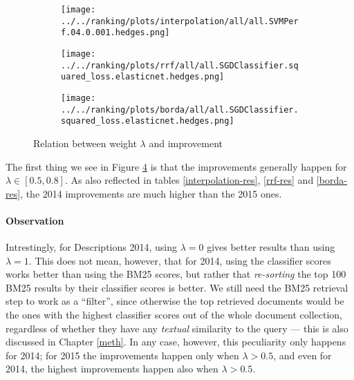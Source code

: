 \begin{figure}[h!]

\begin{subfigure}[b]{\textwidth}
 \centerline {
  \texttt{[image: ../../ranking/plots/interpolation/all/all.SVMPerf.04.0.001.hedges.png]}
  }
  \label{interp-weight}
\end{subfigure}
\begin{subfigure}[b]{\textwidth}
\centerline{
  \texttt{[image: ../../ranking/plots/rrf/all/all.SGDClassifier.squared\_loss.elasticnet.hedges.png]}
  }
  \label{rrf-weight}
\end{subfigure}
\begin{subfigure}[b]{\textwidth}
\centerline{
  \texttt{[image: ../../ranking/plots/borda/all/all.SGDClassifier.squared\_loss.elasticnet.hedges.png]}
  }
  \label{borda-weight}
\end{subfigure}
 
 \caption{Relation between weight $\lambda$ and improvement}
 \label{lambda-vary}
 
\end{figure}

The first thing we see in Figure \ref{lambda-vary} is that the improvements generally happen for $\lambda \in [0.5, 0.8]$.
As also reflected in tables \ref{interpolation-res}, \ref{rrf-res} and \ref{borda-res}, the 2014 improvements are much higher than
the 2015 ones. 

\paragraph{Observation} Intrestingly, for Descriptions 2014, using $\lambda = 0$ gives better results
than using $\lambda=1$. This does not mean, however, that for 2014, using the classifier scores 
works better than using the BM25 scores, but rather that
\emph{re-sorting} the top 100 BM25 results by their classifier scores is better. 
We still need the BM25 retrieval step to work as a ``filter'',
since otherwise the top retrieved documents would be the ones with the highest classifier scores out of the whole document collection, 
regardless of whether
they have any \emph{textual} similarity to the query --- this is also discussed in Chapter \ref{meth}.
In any case,  however, this peculiarity only happens for 2014; for 2015 the improvements happen only when $\lambda>0.5$,
and even for 2014, the highest improvements happen also when $\lambda>0.5$.

